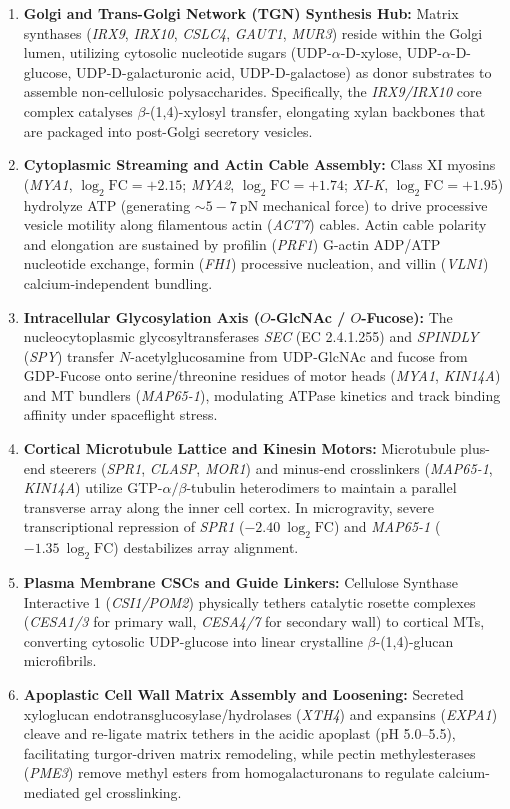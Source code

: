 \begin{enumerate}
    \item \textbf{Golgi and Trans-Golgi Network (TGN) Synthesis Hub:} Matrix synthases (\textit{IRX9}, \textit{IRX10}, \textit{CSLC4}, \textit{GAUT1}, \textit{MUR3}) reside within the Golgi lumen, utilizing cytosolic nucleotide sugars (UDP-$\alpha$-D-xylose, UDP-$\alpha$-D-glucose, UDP-D-galacturonic acid, UDP-D-galactose) as donor substrates to assemble non-cellulosic polysaccharides. Specifically, the \textit{IRX9/IRX10} core complex catalyses $\beta$-(1,4)-xylosyl transfer, elongating xylan backbones that are packaged into post-Golgi secretory vesicles.
    \item \textbf{Cytoplasmic Streaming and Actin Cable Assembly:} Class XI myosins (\textit{MYA1}, $\log_2\text{FC} = +2.15$; \textit{MYA2}, $\log_2\text{FC} = +1.74$; \textit{XI-K}, $\log_2\text{FC} = +1.95$) hydrolyze ATP (generating $\sim 5-7~\text{pN}$ mechanical force) to drive processive vesicle motility along filamentous actin (\textit{ACT7}) cables. Actin cable polarity and elongation are sustained by profilin (\textit{PRF1}) G-actin ADP/ATP nucleotide exchange, formin (\textit{FH1}) processive nucleation, and villin (\textit{VLN1}) calcium-independent bundling.
    \item \textbf{Intracellular Glycosylation Axis ($O$-GlcNAc / $O$-Fucose):} The nucleocytoplasmic glycosyltransferases \textit{SEC} (EC 2.4.1.255) and \textit{SPINDLY} (\textit{SPY}) transfer $N$-acetylglucosamine from UDP-GlcNAc and fucose from GDP-Fucose onto serine/threonine residues of motor heads (\textit{MYA1}, \textit{KIN14A}) and MT bundlers (\textit{MAP65-1}), modulating ATPase kinetics and track binding affinity under spaceflight stress.
    \item \textbf{Cortical Microtubule Lattice and Kinesin Motors:} Microtubule plus-end steerers (\textit{SPR1}, \textit{CLASP}, \textit{MOR1}) and minus-end crosslinkers (\textit{MAP65-1}, \textit{KIN14A}) utilize GTP-$\alpha/\beta$-tubulin heterodimers to maintain a parallel transverse array along the inner cell cortex. In microgravity, severe transcriptional repression of \textit{SPR1} ($-2.40~\log_2\text{FC}$) and \textit{MAP65-1} ($-1.35~\log_2\text{FC}$) destabilizes array alignment.
    \item \textbf{Plasma Membrane CSCs and Guide Linkers:} Cellulose Synthase Interactive 1 (\textit{CSI1/POM2}) physically tethers catalytic rosette complexes (\textit{CESA1/3} for primary wall, \textit{CESA4/7} for secondary wall) to cortical MTs, converting cytosolic UDP-glucose into linear crystalline $\beta$-(1,4)-glucan microfibrils.
    \item \textbf{Apoplastic Cell Wall Matrix Assembly and Loosening:} Secreted xyloglucan endotransglucosylase/hydrolases (\textit{XTH4}) and expansins (\textit{EXPA1}) cleave and re-ligate matrix tethers in the acidic apoplast (pH 5.0–5.5), facilitating turgor-driven matrix remodeling, while pectin methylesterases (\textit{PME3}) remove methyl esters from homogalacturonans to regulate calcium-mediated gel crosslinking.
\end{enumerate}

